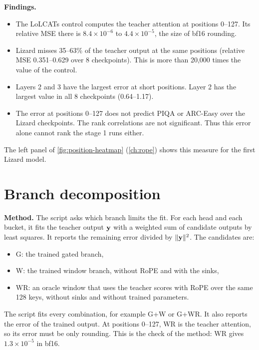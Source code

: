 \textbf{Findings.}
\begin{itemize}
\item The LoLCATs control computes the teacher attention at positions 0--127. Its relative MSE there is $8.4 \times 10^{-6}$ to $4.4 \times 10^{-5}$, the size of bf16 rounding.
\item Lizard misses 35--63\% of the teacher output at the same positions (relative MSE 0.351--0.629 over 8 checkpoints). This is more than 20,000 times the value of the control.
\item Layers 2 and 3 have the largest error at short positions. Layer 2 has the largest value in all 8 checkpoints (0.64--1.17).
\item The error at positions 0--127 does not predict PIQA or ARC-Easy over the Lizard checkpoints. The rank correlations are not significant. Thus this error alone cannot rank the stage 1 runs either.
\end{itemize}

The left panel of \cref{fig:position-heatmap} (\cref{ch:rope}) shows this measure for the first Lizard model.

\section{Branch decomposition}
\label{sec:xai-branch}

\textbf{Method.} The script  asks which branch limits the fit. For each head and each bucket, it fits the teacher output $\mathbf{y}$ with a weighted sum of candidate outputs by least squares. It reports the remaining error divided by $\|\mathbf{y}\|^2$. The candidates are:
\begin{itemize}
\item G: the trained gated branch,
\item W: the trained window branch, without RoPE and with the sinks,
\item WR: an oracle window that uses the teacher scores with RoPE over the same 128 keys, without sinks and without trained parameters.
\end{itemize}
The script fits every combination, for example G+W or G+WR. It also reports the error of the trained output. At positions 0--127, WR is the teacher attention, so its error must be only rounding. This is the check of the method: WR gives $1.3 \times 10^{-5}$ in bf16.

